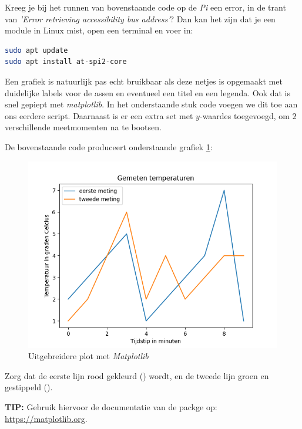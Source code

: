 \newpage

\begin{remark}
Kreeg je bij het runnen van bovenstaande code op de \textit{Pi} een error, in de trant van \textit{'Error retrieving accessibility bus address'}? Dan kan het zijn dat je een module in Linux mist, open een terminal en voer in: 
\begin{lstlisting}[language=bash]
sudo apt update
sudo apt install at-spi2-core
\end{lstlisting}
\end{remark}

Een grafiek is natuurlijk pas echt bruikbaar als deze netjes is opgemaakt met duidelijke labels voor de assen en eventueel een titel en een legenda. Ook dat is snel gepiept met \textit{matplotlib}. In het onderstaande stuk code voegen we dit toe aan ons eerdere script. Daarnaast is er een extra set met $y$-waardes toegevoegd, om $2$ verschillende meetmomenten na te bootsen.


De bovenstaande code produceert onderstaande grafiek \ref{fig:plot2}:
\begin{figure}[!ht]
\centering\includegraphics[scale=0.7]{Pictures/chapter07/plot2.png}
\caption{Uitgebreidere plot met \textit{Matplotlib}}
\label{fig:plot2} 
\end{figure}

\begin{exercise}
Zorg dat de eerste lijn rood gekleurd () wordt, en de tweede lijn groen en gestippeld (). 

\textbf{TIP: } Gebruik hiervoor de documentatie van de packge op: \url{https://matplotlib.org}. 
\end{exercise}

